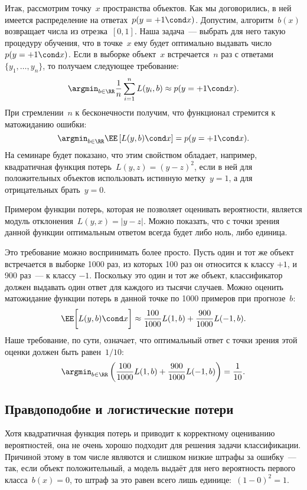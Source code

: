 \documentclass[12pt,fleqn]{article}
\begin{document}
Итак, рассмотрим точку~$x$ пространства объектов.
Как мы договорились, в ней имеется распределение на ответах~$p(y = +1 \cond x)$.
Допустим, алгоритм~$b(x)$ возвращает числа из отрезка~$[0, 1]$.
Наша задача~--- выбрать для него такую процедуру обучения, что в точке~$x$
ему будет оптимально выдавать число~$p(y = +1 \cond x)$.
Если в выборке объект~$x$ встречается~$n$ раз с ответами~$\{y_1, \dots, y_n\}$,
то получаем следующее требование:
\[
    \argmin_{b \in \RR}
    \frac{1}{n}
    \sum_{i = 1}^{n}
        L(y_i, b)
    \approx
    p(y = +1 \cond x).
\]
При стремлении~$n$ к бесконечности получим, что функционал стремится к матожиданию ошибки:
\[
    \argmin_{b \in \RR}
    \EE \left[
        L(y, b)
        \cond
        x
    \right]
    =
    p(y = +1 \cond x).
\]
На семинаре будет показано, что этим свойством обладает, например, квадратичная функция потерь~$L(y, z) = (y - z)^2$,
если в ней для положительных объектов использовать истинную метку~$y = 1$, а для отрицательных брать~$y = 0$.

Примером функции потерь, которая не позволяет оценивать вероятности, является модуль отклонения~$L(y, x) = |y - z|$.
Можно показать, что с точки зрения данной функции оптимальным ответом всегда будет либо ноль, либо единица.

Это требование можно воспринимать более просто.
Пусть один и тот же объект встречается в выборке 1000 раз,
из которых 100 раз он относится к классу $+1$, и 900 раз~--- к классу $-1$.
Поскольку это один и тот же объект, классификатор должен выдавать один ответ
для каждого из тысячи случаев.
Можно оценить матожидание функции потерь в данной точке по 1000 примеров при прогнозе~$b$:
\[
    \EE \biggl[
        L(y, b)
        \cond
        x
    \biggr]
    \approx
    \frac{100}{1000}
    L(1, b)
    +
    \frac{900}{1000}
    L(-1, b).
\]
Наше требование, по сути, означает, что оптимальный ответ
с точки зрения этой оценки должен быть равен~$1/10$:
\[
    \argmin_{b \in \RR} \left(
        \frac{100}{1000} L(1, b)
        +
        \frac{900}{1000} L(-1, b)
    \right)
    =
    \frac{1}{10}.
\]

\subsection{Правдоподобие и логистические потери}
Хотя квадратичная функция потерь и приводит к корректному оцениванию вероятностей,
она не очень хорошо подходит для решения задачи классификации.
Причиной этому в том числе являются и слишком низкие штрафы за ошибку~---
так, если объект положительный, а модель выдаёт для него вероятность первого класса~$b(x) = 0$,
то штраф за это равен всего лишь единице:~$(1 - 0)^2 = 1$.
\end{document}
